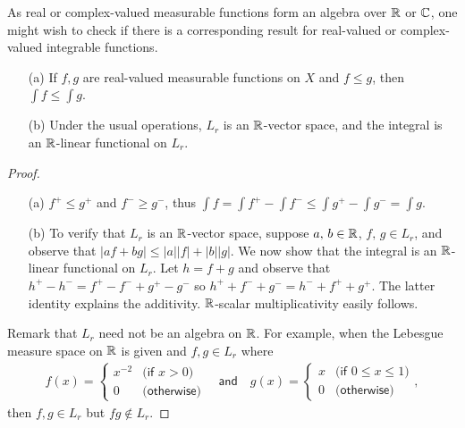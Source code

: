 As real or complex-valued measurable functions form an algebra over ${\mathbb{R}}$ or ${\mathbb{C}}$, one might wish to check if there is a corresponding result for real-valued or complex-valued integrable functions.
\begin{prop}\label{properties for real L}
    \begin{enumerate}
        \item[(a)]
        {
            If $f, g$ are real-valued measurable functions on $X$ and $f\leq g$, then $\int f\leq\int g$.
        }
        \item[(b)]
        {
            Under the usual operations, $L_r$ is an ${\mathbb{R}}$-vector space, and the integral is an ${\mathbb{R}}$-linear functional on $L_r$.
        }
    \end{enumerate}
\end{prop}
\begin{proof}
    \begin{enumerate}
        \item[(a)]
        {
            $f^+\leq g^+$ and $f^-\geq g^-$, thus $\int f=\int f^+-\int f^-\leq\int g^+-\int g^-=\int g$.
        }
        \item[(b)]
        {
            To verify that $L_r$ is an ${\mathbb{R}}$-vector space, suppose $a,\,b\in{\mathbb{R}}$, $f,\,g\in L_r$, and observe that $|af+bg|\leq|a||f|+|b||g|$.
            We now show that the integral is an ${\mathbb{R}}$-linear functional on $L_r$.
            Let $h=f+g$ and observe that ${h^+}-{h^-}={f^+}-{f^-}+{g^+}-{g^-}$ so $h^++f^-+g^-=h^-+f^++g^+$.
            The latter identity explains the additivity.
            ${\mathbb{R}}$-scalar multiplicativity easily follows.
        }
    \end{enumerate}
    Remark that $L_r$ need not be an algebra on ${\mathbb{R}}$.
    For example, when the Lebesgue measure space on ${\mathbb{R}}$ is given and $f, g\in L_r$ where
    \begin{align*}
        f(x)=\begin{cases}
            x^{-2}  &   \textsf{(if $x>0$)}\\
            0       &   \textsf{(otherwise)}
        \end{cases}
        \quad\textsf{and}\quad
        g(x)=\begin{cases}
            x       &   \textsf{(if $0\leq x\leq 1$)}\\
            0       &   \textsf{(otherwise)}
        \end{cases},
    \end{align*}
    then $f, g\in L_r$ but $fg\notin L_r$.
\end{proof}

